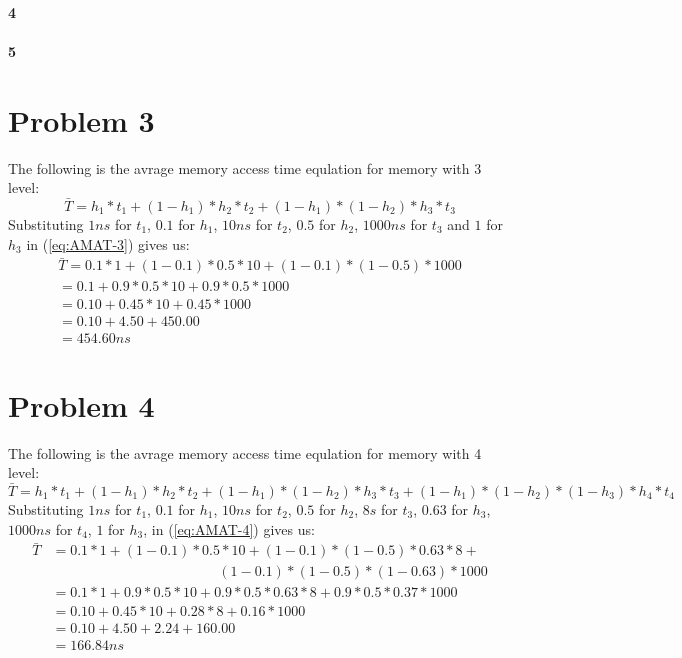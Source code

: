 \documentclass[11pt]{article}
\begin{document}
\paragraph{4}
\paragraph{5}
\section{Problem 3}
The following is the avrage memory access time equlation for
memory with 3 level:
\begin{equation}
	\label{eq:AMAT-3}
	\bar{T} = h_1 * t_1 + (1 - h_1) * h_2 * t_2 + (1 - h_1) * (1 - h_2) * h_3 * t_3
\end{equation}
Substituting $1ns$ for $t_1$, $0.1$ for $h_1$, $10ns$ for $t_2$, $0.5$ for $h_2$, $1000ns$ for $t_3$ and $1$ for $h_3$
in (\ref{eq:AMAT-3}) gives us:
\begin{align*}
	\bar{T} = 0.1 * 1 + (1 - 0.1) * 0.5 * 10 + (1 - 0.1) * (1 - 0.5) * 1000\\
	= 0.1 + 0.9 * 0.5 * 10 + 0.9 * 0.5 * 1000\\
	= 0.10 + 0.45 * 10 + 0.45 * 1000\\
	= 0.10 + 4.50 + 450.00\\
	= 454.60ns
\end{align*}
\section{Problem 4}
The following is the avrage memory access time equlation for
memory with 4 level:
\begin{equation}
	\label{eq:AMAT-4}
	\bar{T} = h_1 * t_1 + (1 - h_1) * h_2 * t_2 + (1 - h_1) * (1 - h_2) * h_3 * t_3 + (1 - h_1) * (1 - h_2) * (1 - h_3) * h_4 * t_4
\end{equation}
Substituting $1ns$ for $t_1$, $0.1$ for $h_1$, $10ns$ for $t_2$, $0.5$ for $h_2$, $8s$ for $t_3$, $0.63$ for $h_3$,$1000ns$ for $t_4$, $1$ for $h_3$,
in (\ref{eq:AMAT-4}) gives us:
\begin{align*}
	\bar{T} &= 0.1 * 1 + (1 - 0.1) * 0.5 * 10 + (1 - 0.1) * (1 - 0.5) * 0.63 * 8 + \\
	&\qquad \phantom{= 0.1 * 1 + (1 - 0.1)} (1 - 0.1) * (1 - 0.5) * (1 - 0.63) * 1000 \\
	&= 0.1 * 1 + 0.9 * 0.5 * 10 + 0.9 * 0.5 * 0.63 * 8 + 0.9 * 0.5 * 0.37 * 1000 \\
	&= 0.10 + 0.45 * 10 + 0.28 * 8 + 0.16 * 1000 \\
	&= 0.10 + 4.50 + 2.24 + 160.00 \\
	&= 166.84ns
\end{align*}
\end{document}
